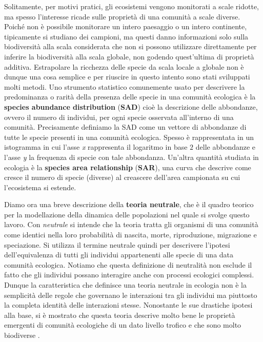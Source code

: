 Solitamente, per motivi pratici, gli ecosistemi vengono monitorati a scale ridotte, ma spesso l'interesse ricade sulle proprietà di una comunità a scale diverse.
Poiché non è possibile monitorare un intero paesaggio o un intero continente, tipicamente si studiano dei campioni, ma questi danno informazioni solo sulla biodiversità alla scala considerata che non si possono utilizzare direttamente per inferire la biodiversità alla scala globale, non godendo quest'ultima di proprietà additiva. Estrapolare la ricchezza delle specie da scala locale a globale non è dunque una cosa semplice e per riuscire in questo intento sono stati sviluppati molti metodi. Uno strumento statistico comunemente usato per descrivere la predominanza o rarità della presenza delle specie in una comunità ecologica è la \textbf{species abundance distribution} (\textbf{SAD}) cioè la descrizione delle abbondanze, ovvero il numero di individui, per ogni specie osservata all'interno di una comunità\cite{doi:McGill2007}. Precisamente definiamo la SAD come un vettore di abbondanze di tutte le specie presenti in una comunità ecologica. Spesso è rappresentata in un istogramma in cui l'asse \emph{x} rappresenta il logaritmo in base $2$ delle abbondanze e l'asse \emph{y} la frequenza di specie con tale abbondanza\cite{Preston}. Un'altra quantità studiata in ecologia è la \textbf{species area relationship} (\textbf{SAR}), una curva che descrive come cresce il numero di specie (diverse) al creascere dell'area campionata su cui l'ecosistema si estende.


Diamo ora una breve descrizione della \textbf{teoria neutrale}, che è il quadro teorico per la modellazione della dinamica delle popolazioni nel quale si svolge questo lavoro\cite{Hubbell}. Con \emph{neutrale} si intende che la teoria tratta gli organismi di una comunità come identici nella loro probabilità di nascita, morte, riproduzione, migrazione e speciazione. Si utilizza il termine neutrale quindi per descrivere l'ipotesi dell'equivalenza di tutti gli individui appartenenti alle specie di una data comunità ecologica. Notiamo che questa definizione di neutralità non esclude il fatto che gli individui possano interagire anche con processi ecologici complessi. Dunque la caratteristica che definisce una teoria neutrale in ecologia non è la semplicità delle regole che governano le interazioni tra gli individui ma piuttosto la completa identità delle interazioni stesse. Nonostante le sue drastiche ipotesi alla base, si è mostrato che questa teoria descrive molto bene le proprietà emergenti di comunità ecologiche di un dato livello trofico e che sono molto biodiverse \cite{2016AzaeleSuweis}.



